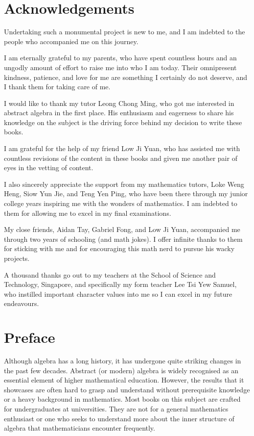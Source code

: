 \newpage

\createtoc

\chapter{Acknowledgements}
Undertaking such a monumental project is new to me, and I am indebted to the people who accompanied me on this journey.

I am eternally grateful to my parents, who have spent countless hours and an ungodly amount of effort to raise me into who I am today. Their omnipresent kindness, patience, and love for me are something I certainly do not deserve, and I thank them for taking care of me.

I would like to thank my tutor Leong Chong Ming, who got me interested in abstract algebra in the first place. His enthusiasm and eagerness to share his knowledge on the subject is the driving force behind my decision to write these books.

I am grateful for the help of my friend Low Ji Yuan, who has assisted me with countless revisions of the content in these books and given me another pair of eyes in the vetting of content.

I also sincerely appreciate the support from my mathematics tutors, Loke Weng Heng, Siow Yun Jie, and Teng Yen Ping, who have been there through my junior college years inspiring me with the wonders of mathematics. I am indebted to them for allowing me to excel in my final examinations.

My close friends, Aidan Tay, Gabriel Fong, and Low Ji Yuan, accompanied me through two years of schooling (and math jokes). I offer infinite thanks to them for sticking with me and for encouraging this math nerd to pursue his wacky projects.

A thousand thanks go out to my teachers at the School of Science and Technology, Singapore, and specifically my form teacher Lee Tsi Yew Samuel, who instilled important character values into me so I can excel in my future endeavours.

\chapter{Preface}
Although algebra has a long history, it has undergone quite striking changes in the past few decades. Abstract (or modern) algebra is widely recognised as an essential element of higher mathematical education. However, the results that it showcases are often hard to grasp and understand without prerequisite knowledge or a heavy background in mathematics. Most books on this subject are crafted for undergraduates at universities. They are not for a general mathematics enthusiast or one who seeks to understand more about the inner structure of algebra that mathematicians encounter frequently.

